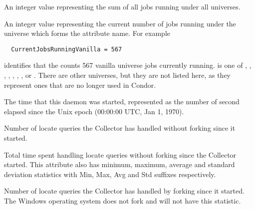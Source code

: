 \begin{description}
\item[\AdAttr{CurrentJobsRunningAll}:] An integer value representing the sum of
  all jobs running under all universes.

\item[\AdAttr{CurrentJobsRunning<universe>}:] An integer value representing
  the current number of jobs running under the universe which forms 
  the attribute name.  For example
\begin{verbatim}
  CurrentJobsRunningVanilla = 567
\end{verbatim}
  identifies that the  counts 567 vanilla universe jobs
  currently running.
   is one of 
  , , , ,
  , , , or .
  There are other universes, but they are not listed here, as they represent
  ones that are no longer used in Condor.

\item[\AdAttr{DaemonStartTime}:] The time that this daemon was
  started, represented as the number of second elapsed since
  the Unix epoch (00:00:00 UTC, Jan 1, 1970).

\item[\AdAttr{HandleLocate}:] Number of locate queries the Collector has handled without forking since it started.

\item[\AdAttr{HandleLocateRuntime}:] Total time spent handling locate queries without forking since the Collector started.
This attribute also has minimum, maximum, average and standard deviation statistics with Min, Max, Avg and Std suffixes respectively.

\item[\AdAttr{HandleLocateForked}:] Number of locate queries the Collector has handled by forking since it started.
The Windows operating system does not fork and will not have this statistic.


\end{description}
